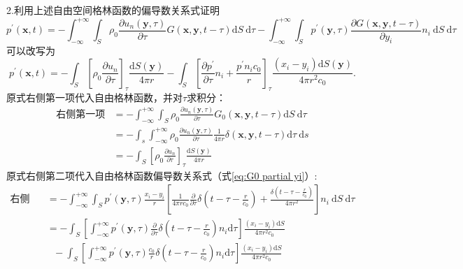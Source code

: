 \clearpage

\noindent 2.利用上述自由空间格林函数的偏导数关系式证明
$$
p^{\prime}(\mathbf{x}, t)=-\int_{-\infty}^{+\infty} \int_{S} \rho_{0} \frac{\partial u_{n}(\mathbf{y}, \tau)}{\partial \tau} G(\mathbf{x}, \mathbf{y}, t-\tau) \mathrm{d} S \mathrm{~d} \tau-\int_{-\infty}^{+\infty} \int_{S} p^{\prime}(\mathbf{y}, \tau) \frac{\partial G(\mathbf{x}, \mathbf{y}, t-\tau)}{\partial y_{i}} n_{i} \mathrm{~d} S \mathrm{~d} \tau
$$
可以改写为
$$
p^{\prime}(\mathbf{x}, t)=-\int_{S}\left[\rho_{0} \frac{\partial u_{n}}{\partial \tau}\right]_{\tau} \frac{\mathrm{d} S(\mathbf{y})}{4 \pi r}-\int_{S}\left[\frac{\partial p^{\prime}}{\partial \tau} n_{i}+\frac{p^{\prime} n_{i} c_{0}}{r}\right]_{\tau} \frac{\left(x_{i}-y_{i}\right) \mathrm{d} S(\mathbf{y})}{4 \pi r^{2} c_{0}}.
$$
原式右侧第一项代入自由格林函数，并对$\tau$求积分：
\begin{equation}
    \label{eq:right first final}
    \begin{aligned}
        \mbox{右侧第一项} &= -\int_{-\infty}^{+\infty} \int_{S} \rho_{0} \frac{\partial u_{n}(\mathbf{y}, \tau)}{\partial \tau} G_{0}(\mathbf{x}, \mathbf{y}, t-\tau) \mathrm{d} S \mathrm{~d} \tau \\
        &= -\int_{s} \int_{-\infty}^{+\infty} \rho_{0} \frac{\partial u_{n}(\mathbf{y}, \tau)}{\partial \tau} \frac{1}{4 \pi r} \delta(\mathbf{x}, \mathbf{y}, t-\tau) \mathrm{d} \tau \mathrm{~d} s \\
        &= -\int_{S}\left[\rho_{0} \frac{\partial u_{n}}{\partial \tau}\right]_{\tau} \frac{\mathrm{d} S(\mathbf{y})}{4 \pi r}
    \end{aligned}
\end{equation}
原式右侧第二项代入自由格林函数偏导数关系式（式\eqref{eq:G0 partial yi}）:
\begin{equation}
    \label{eq:second}
    \begin{aligned}
        \mbox{右侧第二项} &= -\int_{-\infty}^{+\infty} \int_{S} p^{\prime}(\mathbf{y}, \tau) 
        \frac{x_{i}-y_{i}}{r}\left[\frac{1}{4 \pi r c_{0}} \frac{\partial}{\partial \tau} \delta\left(t-\tau-\frac{r}{c_{0}} \right)+
            \frac{\delta\left(t-\tau-\frac{r}{c_{0}}\right)}{4 \pi r^{2}}\right]
        n_{i} \mathrm{~d} S \mathrm{~d} \tau \\
        &= -\int_S \left[ \int_{-\infty}^{+\infty} p^{\prime}(\mathbf{y}, \tau) \frac{\partial}{\partial \tau} \delta\left(t-\tau-\frac{r}{c_{0}} \right) n_i \mathrm{d} \tau\right]  \frac{\left( x_{i}-y_{i} \right) \mathrm{d} S}{4 \pi r^2 c_{0}} \\
        &{~~~}-\int_S \left[ \int_{-\infty}^{+\infty} p^{\prime}(\mathbf{y}, \tau) \frac{c_0}{r} \delta\left(t-\tau-\frac{r}{c_{0}} \right) n_i \mathrm{d} \tau\right]  \frac{\left( x_{i}-y_{i} \right) \mathrm{d} S}{4 \pi r^2 c_{0}}
    \end{aligned}
\end{equation}
